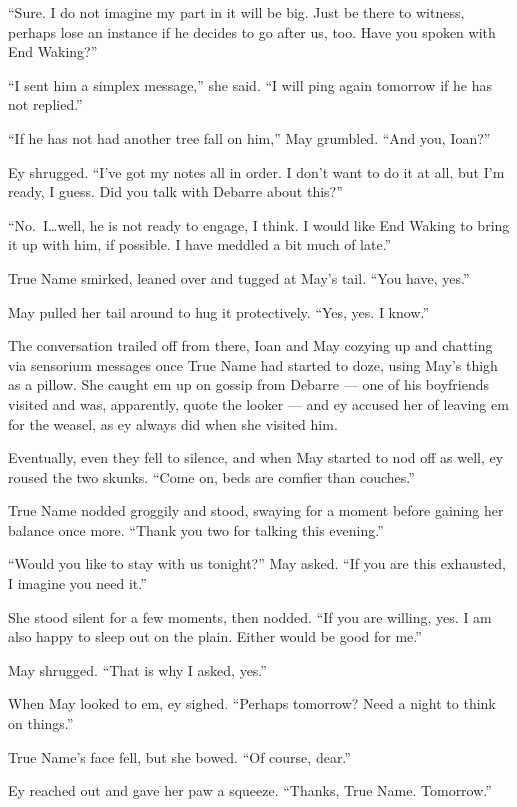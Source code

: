 ``Sure. I do not imagine my part in it will be big. Just be there to witness, perhaps lose an instance if he decides to go after us, too. Have you spoken with End Waking?''

``I sent him a simplex message,'' she said. ``I will ping again tomorrow if he has not replied.''

``If he has not had another tree fall on him,'' May grumbled. ``And you, Ioan?''

Ey shrugged. ``I've got my notes all in order. I don't want to do it at all, but I'm ready, I guess. Did you talk with Debarre about this?''

``No.~I\ldots well, he is not ready to engage, I think. I would like End Waking to bring it up with him, if possible. I have meddled a bit much of late.''

True Name smirked, leaned over and tugged at May's tail. ``You have, yes.''

May pulled her tail around to hug it protectively. ``Yes, yes. I know.''

The conversation trailed off from there, Ioan and May cozying up and chatting via sensorium messages once True Name had started to doze, using May's thigh as a pillow. She caught em up on gossip from Debarre — one of his boyfriends visited and was, apparently, quote the looker — and ey accused her of leaving em for the weasel, as ey always did when she visited him.

Eventually, even they fell to silence, and when May started to nod off as well, ey roused the two skunks. ``Come on, beds are comfier than couches.''

True Name nodded groggily and stood, swaying for a moment before gaining her balance once more. ``Thank you two for talking this evening.''

``Would you like to stay with us tonight?'' May asked. ``If you are this exhausted, I imagine you need it.''

She stood silent for a few moments, then nodded. ``If you are willing, yes. I am also happy to sleep out on the plain. Either would be good for me.''

May shrugged. ``That is why I asked, yes.''

When May looked to em, ey sighed. ``Perhaps tomorrow? Need a night to think on things.''

True Name's face fell, but she bowed. ``Of course, dear.''

Ey reached out and gave her paw a squeeze. ``Thanks, True Name. Tomorrow.''

